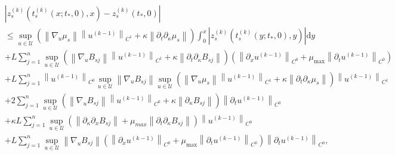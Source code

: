 \documentclass[notitlepage,cs4size,punct,oneside]{ctexrep}
\numberwithin{equation}{chapter}
\theoremstyle{mystyle}
\begin{document}
\begin{align}
     & \left|z_{s}^{(k)}  \left(t_{s}^{(k)}\left(x ; t_{*}, 0\right), x\right)-z_{s}^{(k)}\left(t_{*}, 0\right)\right|\nonumber                                                                                                                                                                                                                               \\
     & \leq  \sup _{u \in \mathcal{U}} \left( \left\|\nabla_{u} \mu_{s}\right\| \left\|u^{(k-1)}\right\|_{C^{1}}  + \kappa \left\| \partial_{t} \partial_{\kappa }  \mu_{s}\right\| \right) \int_{0}^{x}\left|z_{s}^{(k)}\left(t_{s}^{(k)}\left(y ; t_{*}, 0\right), y\right)\right| \mathrm{d} y\nonumber                                                    \\
     & +L \sum_{j=1}^{n} \sup _{u \in \mathcal{U}} \left( \left\|\nabla_{u} B_{s j}\right\| \left\| u^{(k-1)}\right\|_{C^{1}} + \kappa \left\| \partial_{t} \partial_{\kappa }  B_{s j}\right\| \right) \left(\left\|\partial_{x} u^{(k-1)}\right\|_{C^{0}}+\mu_{\max }\left\|\partial_{t} u^{(k-1)}\right\|_{C^{0}}\right)\nonumber                          \\
     & +L \sum_{j=1}^{n}\left\|u^{(k-1)}\right\|_{C^{0}}\sup _{u \in \mathcal{U}}\left\|\nabla_{u} B_{s j}\right\| \sup _{u \in \mathcal{U}}\left(\left\|\nabla_{u} \mu_{s}\right\| \left\| u^{(k-1)}\right\|_{C^{1}} + \kappa \left\|\partial_{t} \partial_{\kappa }\mu_{s}\right\|\right)  \left\| u^{(k-1)}\right\|_{C^{1}}\nonumber                       \\
     & +2 \sum_{j=1}^{n} \sup _{u \in \mathcal{U}}\left( \left\|\nabla_{u} B_{s j}\right\|\left\|u^{(k-1)}\right\|_{C^{0}} + \kappa \left\| \partial_{\kappa } B_{sj} \right\| \right) \left\|\partial_{t} u^{(k-1)}\right\|_{C^{0}}\nonumber                                                                                                                 \\
     & +\kappa L \sum_{j=1}^{n} \sup _{u \in \mathcal{U}} \left( \left\|\partial_{\kappa } \partial_{x} B_{s j}\right\| + \mu _{max}\left\| \partial_{t} \partial_{\kappa } B_{s j}\right\| \right) \left\| u^{(k-1)}\right\|_{C^{0}}\nonumber                                                                                                                \\
     & +L \sum_{j=1}^{n} \sup _{u \in \mathcal{U}}\left\|\nabla_{u} B_{s j}\right\|\left(\left\|\partial_{x} u^{(k-1)}\right\|_{C^{0}}+\mu_{\max }\left\|\partial_{t} u^{(k-1)}\right\|_{C^{0}}\right)\left\|\partial_{t} u^{(k-1)}\right\|_{C^{0}},\nonumber                                                                                                 \\

\end{align}
\end{document}
